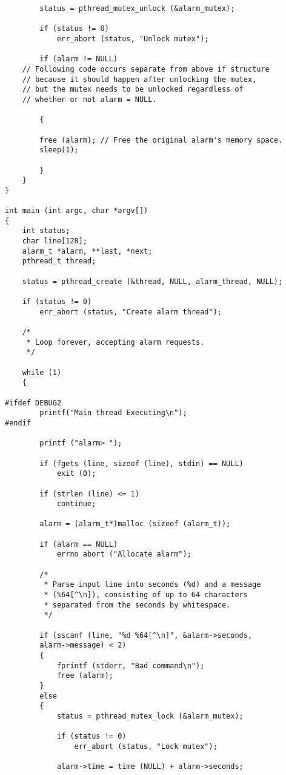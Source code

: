 \documentclass[11pt]{article}
\begin{document}
\begin{lstlisting}
		status = pthread_mutex_unlock (&alarm_mutex);
        
        if (status != 0)
        	err_abort (status, "Unlock mutex");
        	
        if (alarm != NULL) 
	// Following code occurs separate from above if structure
	// because it should happen after unlocking the mutex, 
	// but the mutex needs to be unlocked regardless of 
	// whether or not alarm = NULL.
	
        {
        
        free (alarm); // Free the original alarm's memory space.        
      	sleep(1); 
			
        }		
	}	
}

int main (int argc, char *argv[])
{
    int status;
    char line[128];
    alarm_t *alarm, **last, *next;
    pthread_t thread;

    status = pthread_create (&thread, NULL, alarm_thread, NULL);
    
    if (status != 0)
        err_abort (status, "Create alarm thread");
    
    /*
     * Loop forever, accepting alarm requests.
     */
	 
    while (1)
    {
    
#ifdef DEBUG2
		printf("Main thread Executing\n");
#endif

        printf ("alarm> ");
        
        if (fgets (line, sizeof (line), stdin) == NULL)
        	exit (0);
        	
        if (strlen (line) <= 1)
        	continue;
        	
        alarm = (alarm_t*)malloc (sizeof (alarm_t));
		
		if (alarm == NULL)
            errno_abort ("Allocate alarm");

        /*
         * Parse input line into seconds (%d) and a message
         * (%64[^\n]), consisting of up to 64 characters
         * separated from the seconds by whitespace.
         */
		 
        if (sscanf (line, "%d %64[^\n]", &alarm->seconds, 
		alarm->message) < 2)
        {
            fprintf (stderr, "Bad command\n");
            free (alarm);
        }
        else
        {
            status = pthread_mutex_lock (&alarm_mutex);
            
            if (status != 0)
                err_abort (status, "Lock mutex");
                
            alarm->time = time (NULL) + alarm->seconds;


\end{lstlisting}
\end{document}
